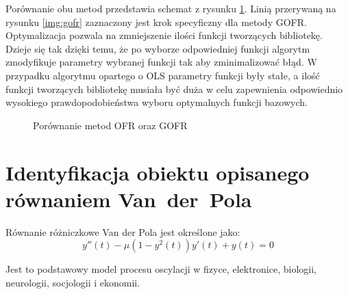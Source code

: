 Porównanie obu metod przedstawia schemat z rysunku \ref{img:ofr_and_gofr}. Linią przerywaną na rysunku \ref{img:gofr} zaznaczony jest krok specyficzny dla metody GOFR. Optymalizacja pozwala na zmniejszenie ilości funkcji tworzących bibliotekę. Dzieje się tak dzięki temu, że po wyborze odpowiedniej funkcji algorytm zmodyfikuje parametry wybranej funkcji tak aby zminimalizować błąd. W przypadku algorytmu opartego o OLS parametry funkcji były stałe, a ilość funkcji tworzących bibliotekę musiała być duża w celu zapewnienia odpowiednio wysokiego prawdopodobieństwa wyboru optymalnych funkcji bazowych.

\begin{figure}[ht!]
	\centering

	
	
	\caption{Porównanie metod OFR oraz GOFR}
	\label{img:ofr_and_gofr}
\end{figure}

\clearpage
\section{Identyfikacja obiektu opisanego równaniem \mbox{Van der Pola}}

Równanie różniczkowe Van der Pola jest określone jako:
\begin{equation}
	\label{wzor:van_der_pol}
	y''(t) - \mu(1 - y^2(t))y'(t) + y(t) = 0
\end{equation}

Jest to podstawowy model procesu oscylacji w fizyce, elektronice, biologii, neurologii, socjologii i ekonomii\cite{Tsatsos}.

